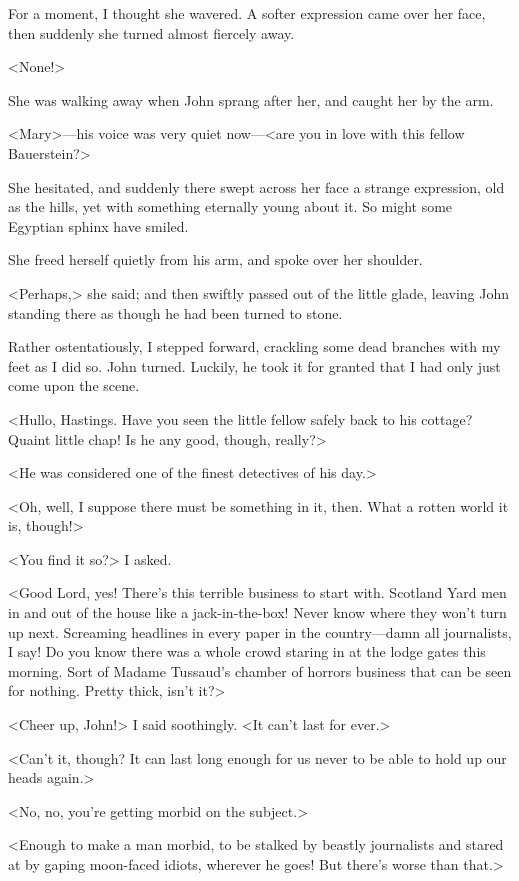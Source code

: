  For a moment, I thought she wavered. A softer expression came over her face, then suddenly she turned almost fiercely away. 

 <None!> 

 She was walking away when John sprang after her, and caught her by the arm. 

 <Mary>—his voice was very quiet now—<are you in love with this fellow Bauerstein?> 

 She hesitated, and suddenly there swept across her face a strange expression, old as the hills, yet with something eternally young about it. So might some Egyptian sphinx have smiled. 

 She freed herself quietly from his arm, and spoke over her shoulder. 

 <Perhaps,> she said; and then swiftly passed out of the little glade, leaving John standing there as though he had been turned to stone. 

 Rather ostentatiously, I stepped forward, crackling some dead branches with my feet as I did so. John turned. Luckily, he took it for granted that I had only just come upon the scene. 

 <Hullo, Hastings. Have you seen the little fellow safely back to his cottage? Quaint little chap! Is he any good, though, really?> 

 <He was considered one of the finest detectives of his day.> 

 <Oh, well, I suppose there must be something in it, then. What a rotten world it is, though!> 

 <You find it so?> I asked. 

 <Good Lord, yes! There's this terrible business to start with. Scotland Yard men in and out of the house like a jack-in-the-box! Never know where they won't turn up next. Screaming headlines in every paper in the country—damn all journalists, I say! Do you know there was a whole crowd staring in at the lodge gates this morning. Sort of Madame Tussaud's chamber of horrors business that can be seen for nothing. Pretty thick, isn't it?> 

 <Cheer up, John!> I said soothingly. <It can't last for ever.> 

 <Can't it, though? It can last long enough for us never to be able to hold up our heads again.> 

 <No, no, you're getting morbid on the subject.> 

 <Enough to make a man morbid, to be stalked by beastly journalists and stared at by gaping moon-faced idiots, wherever he goes! But there's worse than that.> 

